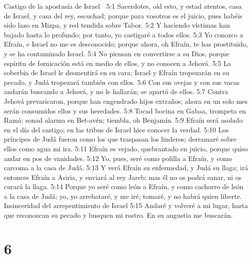 Castigo de la apostasía de Israel  

5:1 Sacerdotes, oíd esto, y estad atentos, casa de Israel, y casa del rey, escuchad; porque para vosotros es el juicio, pues habéis sido lazo en Mizpa, y red tendida sobre Tabor.  
5:2 Y haciendo víctimas han bajado hasta lo profundo; por tanto, yo castigaré a todos ellos.  
5:3 Yo conozco a Efraín, e Israel no me es desconocido; porque ahora, oh Efraín, te has prostituido, y se ha contaminado Israel.  
5:4 No piensan en convertirse a su Dios, porque espíritu de fornicación está en medio de ellos, y no conocen a Jehová.  
5:5 La soberbia de Israel le desmentirá en su cara; Israel y Efraín tropezarán en su pecado, y Judá tropezará también con ellos.  
5:6 Con sus ovejas y con sus vacas andarán buscando a Jehová, y no le hallarán; se apartó de ellos.  
5:7 Contra Jehová prevaricaron, porque han engendrado hijos extraños; ahora en un solo mes serán consumidos ellos y sus heredades.  
5:8 Tocad bocina en Gabaa, trompeta en Ramá: sonad alarma en Bet-avén; tiembla, oh Benjamín.  
5:9 Efraín será asolado en el día del castigo; en las tribus de Israel hice conocer la verdad.  
5:10 Los príncipes de Judá fueron como los que traspasan los linderos; derramaré sobre ellos como agua mi ira.  
5:11 Efraín es vejado, quebrantado en juicio, porque quiso andar en pos de vanidades.  
5:12 Yo, pues, seré como polilla a Efraín, y como carcoma a la casa de Judá.  
5:13 Y verá Efraín su enfermedad, y Judá su llaga; irá entonces Efraín a Asiria, y enviará al rey Jareb; mas él no os podrá sanar, ni os curará la llaga.  
5:14 Porque yo seré como león a Efraín, y como cachorro de león a la casa de Judá; yo, yo arrebataré, y me iré; tomaré, y no habrá quien liberte.  
Insinceridad del arrepentimiento de Israel  
5:15 Andaré y volveré a mi lugar, hasta que reconozcan su pecado y busquen mi rostro. En su angustia me buscarán.  

\chapter{6}

